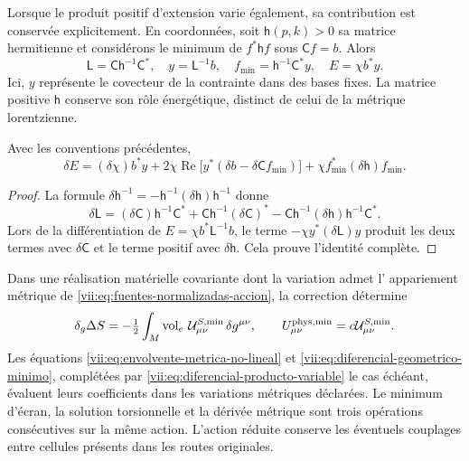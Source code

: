 Lorsque le produit positif d'extension varie également, sa
contribution est conservée explicitement. En coordonnées, soit
\(\mathsf h(p,k)>0\) sa matrice hermitienne et considérons le minimum
de \(f^*\mathsf h f\) sous \(\mathsf C f=b\). Alors
\begin{equation}
 \mathsf L=\mathsf C\mathsf h^{-1}\mathsf C^*,\quad
 y=\mathsf L^{-1}b,\quad
 f_{\min}=\mathsf h^{-1}\mathsf C^*y,\quad
 E=\chi b^*y.
 \label{vii:eq:minimo-producto-variable}
\end{equation}
Ici, \(y\) représente le covecteur de la contrainte dans des bases fixes. La matrice positive \(\mathsf h\) conserve son rôle énergétique, distinct de celui de la métrique lorentzienne.

\begin{lemma}
\label{vii:lem:producto-variable-extension}
Avec les conventions précédentes,
\begin{equation}
 \delta E=(\delta\chi)b^*y
   +2\chi\operatorname{Re}\bigl[y^*(\delta b-\delta\mathsf C f_{\min})\bigr]
   +\chi f_{\min}^*(\delta\mathsf h)f_{\min}.
 \label{vii:eq:diferencial-producto-variable}
\end{equation}
\end{lemma}
\begin{proof}
La formule \(\delta\mathsf h^{-1}
=-\mathsf h^{-1}(\delta\mathsf h)\mathsf h^{-1}\) donne
\[
 \delta\mathsf L=(\delta\mathsf C)\mathsf h^{-1}\mathsf C^*
 +\mathsf C\mathsf h^{-1}(\delta\mathsf C)^*
 -\mathsf C\mathsf h^{-1}(\delta\mathsf h)
                              \mathsf h^{-1}\mathsf C^*.
\]
Lors de la différentiation de \(E=\chi b^*\mathsf L^{-1}b\), le terme \(-\chi y^*(\delta\mathsf L)y\) produit les deux termes avec \(\delta\mathsf C\) et le terme positif avec \(\delta\mathsf h\). Cela prouve l'identité complète.
\end{proof}

Dans une réalisation matérielle covariante dont la variation admet l'
appariement métrique de
\eqref{vii:eq:fuentes-normalizadas-accion}, la correction détermine
\begin{equation}
 \delta_g\Delta S
 =-\tfrac12\int_M\operatorname{vol}_e\,
          \mathcal U^{S,\min}_{\mu\nu}\,\delta g^{\mu\nu},
 \qquad U^{\rm phys,\min}_{\mu\nu}
                      =c\mathcal U^{S,\min}_{\mu\nu}.
 \label{vii:eq:fuente-metrica-minimo-no-lineal}
\end{equation}
Les équations \eqref{vii:eq:envolvente-metrica-no-lineal} et
\eqref{vii:eq:diferencial-geometrico-minimo}, complétées par
\eqref{vii:eq:diferencial-producto-variable} le cas échéant,
évaluent leurs coefficients dans les variations métriques déclarées.
Le minimum d'écran, la solution torsionnelle et la dérivée métrique
sont trois opérations consécutives sur la même action.
L'action réduite conserve les éventuels couplages entre
cellules présents dans les routes originales.


